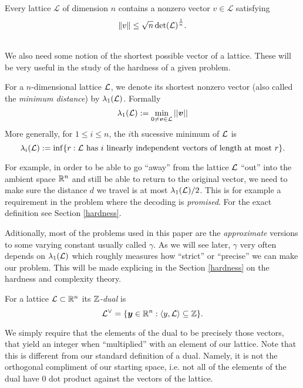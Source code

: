 \begin{theorem}
    Every lattice $\mathcal{L}$ of dimension $n$ contains a nonzero vector $v \in \mathcal{L}$ satisfying
    $$ \norm{v} \leq \sqrt{n} \det(\mathcal{L})^{\frac{1}{n}}.$$
\end{theorem}
\\
\fi
We also need some notion of the shortest possible vector of a lattice. These will be very useful in the study of the hardness of a given problem.
\begin{definition}
	For a $n$-dimensional lattice $\mathcal{L}$, we denote its shortest nonzero vector (also called the \textit{minimum distance}) by $\lambda_1(\mathcal{L})$. Formally
	\[ \lambda_1(\mathcal{L}) := \min_{0 \neq \boldsymbol{v} \in \mathcal{L}} ||\boldsymbol{v}|| \]
	More generally, for $1 \leq i \leq n$, the $i$th sucessive minimum of $\mathcal{L}$ is
	\[\lambda_i(\mathcal{L}) := \inf \{r : \mathcal{L} \text{ has $i$ linearly independent vectors of length at most } r \}. \]
\end{definition}
For example, in order to be able to go ``away'' from the lattice $\mathcal{L}$ ``out'' into the ambient space $\mathbb{R}^n$ and still be able to return to the original vector, we need to make sure the distance $d$ we travel is at most $\lambda_1(\mathcal{L})/2$. This is for example a requirement in the  problem where the decoding is \textit{promised}. For the exact definition see Section \ref{hardness}.

Aditionally, most of the problems used in this paper are the \textit{approximate} versions to some varying constant usually called $\gamma$. As we will see later, $\gamma$ very often depends on $\lambda_1(\mathcal{L})$ which roughly measures how ``strict'' or ``precise'' we can make our problem. This will be made explicing in the Section \ref{hardness} on the hardness and complexity theory.

\begin{definition}[Dual]
    For a lattice $\mathcal{L} \subset \mathbb{R}^n$ its $\mathbb{Z}$\textit{-dual} is
	\[ \mathcal{L}^{\vee} = \{ \boldsymbol{y} \in \mathbb{R}^n : \langle y,\mathcal{L} \rangle \subseteq \mathbb{Z} \}.\]
\end{definition}

We simply require that the elements of the dual to be precisely those vectors, that yield an integer when ``multiplied'' with an element of our lattice. Note that this is different from our standard definition of a dual. Namely, it is not the orthogonal compliment of our starting space, i.e. not all of the elements of the dual have 0 dot product against the vectors of the lattice.


